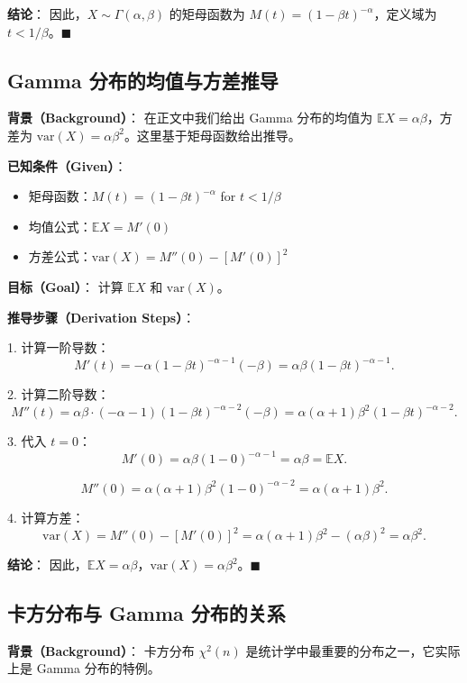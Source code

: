 \textbf{结论}：
因此，$X \sim \Gamma(\alpha, \beta)$ 的矩母函数为 $M(t) = (1 - \beta t)^{-\alpha}$，定义域为 $t < 1/\beta$。$\blacksquare$

\subsection{Gamma 分布的均值与方差推导}\label{sec:gamma-mean-variance}

\textbf{背景（Background）}：
在正文中我们给出 Gamma 分布的均值为 $\mathbb{E}X = \alpha\beta$，方差为 $\text{var}(X) = \alpha\beta^2$。这里基于矩母函数给出推导。

\textbf{已知条件（Given）}：
\begin{itemize}
\item 矩母函数：$M(t) = (1 - \beta t)^{-\alpha}$ for $t < 1/\beta$
\item 均值公式：$\mathbb{E}X = M'(0)$
\item 方差公式：$\text{var}(X) = M''(0) - [M'(0)]^2$
\end{itemize}

\textbf{目标（Goal）}：
计算 $\mathbb{E}X$ 和 $\text{var}(X)$。

\textbf{推导步骤（Derivation Steps）}：

1. 计算一阶导数：
\[
M'(t) = -\alpha(1 - \beta t)^{-\alpha-1}(-\beta) = \alpha\beta(1 - \beta t)^{-\alpha-1}.
\]

2. 计算二阶导数：
\[
M''(t) = \alpha\beta \cdot (-\alpha-1)(1 - \beta t)^{-\alpha-2}(-\beta) = \alpha(\alpha+1)\beta^2(1 - \beta t)^{-\alpha-2}.
\]

3. 代入 $t = 0$：
\[
M'(0) = \alpha\beta(1 - 0)^{-\alpha-1} = \alpha\beta = \mathbb{E}X.
\]

\[
M''(0) = \alpha(\alpha+1)\beta^2(1 - 0)^{-\alpha-2} = \alpha(\alpha+1)\beta^2.
\]

4. 计算方差：
\[
\text{var}(X) = M''(0) - [M'(0)]^2 = \alpha(\alpha+1)\beta^2 - (\alpha\beta)^2 = \alpha\beta^2.
\]

\textbf{结论}：
因此，$\mathbb{E}X = \alpha\beta$，$\text{var}(X) = \alpha\beta^2$。$\blacksquare$

\subsection{卡方分布与 Gamma 分布的关系}\label{sec:chi2-gamma-relation}

\textbf{背景（Background）}：
卡方分布 $\chi^2(n)$ 是统计学中最重要的分布之一，它实际上是 Gamma 分布的特例。


